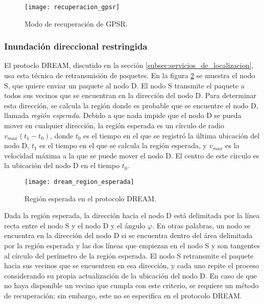 \begin{figure}[th]
\centering
\texttt{[image: recuperacion\_gpsr]}
\decoRule
\caption[Modo de recuperación de GPSR]{Modo de recuperación de
GPSR\protect\footnotemark.}
\label{fig:recuperacion_gpsr}
\end{figure}


\subsubsection{Inundación direccional restringida}
\label{subsubsec:inundacion_direccional_restringida}

El protoclo DREAM, discutido en la sección
\ref{subsec:servicios_de_localizacion}, usa esta técnica de retransmisión de
paquetes. En la figura \ref{fig:dream_region_esperada} se muestra el nodo S,
que quiere enviar un paquete al nodo D. El nodo S transmite el paquete a todos
sus vecinos que se encuentran en la dirección del nodo D. Para determinar esta
dirección, se calcula la región donde es probable que se encuentre el nodo D,
llamada \textit{región esperada}. Debido a que nada impide que el nodo D se
pueda mover en cualquier dirección, la región esperada es un círculo de radio
$v_{max}(t_1-t_0)$, donde $t_0$ es el tiempo en el que se registró la última
ubicación del nodo D, $t_1$ es el tiempo en el que se calcula la región
esperada, y $v_{max}$ es la velocidad máxima a la que se puede mover el nodo D.
El centro de este círculo es la ubicación del nodo D en el tiempo $t_0$.

\begin{figure}[th]
\centering
\texttt{[image: dream\_region\_esperada]}
\decoRule
\caption[Región esperada en el protocolo DREAM]{Región esperada en el protocolo
DREAM\protect\footnotemark.}
\label{fig:dream_region_esperada}
\end{figure}


Dada la región esperada, la dirección hacia el nodo D está delimitada por la
línea recta entre el nodo S y el nodo D y el ángulo $\varphi$. En otras
palabras, un nodo se encuentra en la dirección del nodo D si se encuentra
dentro del área delimitada por la región esperada y las dos líneas que empiezan
en el nodo S y son tangentes al círculo del perímetro de la región esperada. El
nodo S retransmite el paquete hacia sus vecinos que se encuentren en esa
dirección, y cada uno repite el proceso considerando su propia actualización de
la ubicación del nodo D. En caso de que no haya disponible un vecino que cumpla
con este criterio, se requiere un método de recuperación; sin embargo, este no
se especifica en el protocolo DREAM.

